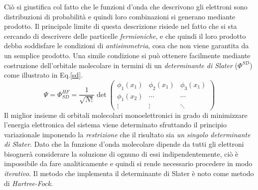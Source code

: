 \documentclass[oneside]{amsbook}
\numberwithin{section}{chapter}
\numberwithin{equation}{section}
\numberwithin{figure}{section}
\begin{document}
Ciò si giustifica col fatto che le funzioni d'onda che descrivono gli elettroni sono distribuzioni di probabilità e quindi loro combinazioni si generano mediante prodotto.
Il principale limite di questa descrizione risiede nel fatto che si sta cercando di descrivere delle particelle \emph{fermioniche}, e che quindi il loro prodotto debba soddisfare le condizioni di \emph{antisimmetria}, cosa che non viene garantita da un semplice prodotto. Una simile condizione si può ottenere facilmente mediante costruzione dell'orbitale molecolare in termini di un \emph{determinante di Slater} ($\Phi ^{SD}$) come illustrato in Eq.\ref{sd}. 
\begin{equation}
\label{sd}
\Psi = \Phi^{HF} _{SD}= \frac{1}{\sqrt{N!}} \det
\begin{pmatrix}
\phi _1 (x_1) & \phi _2 (x_1) & \phi _3 (x_1) \\
\phi _1 (x_2) & \cdots &\cdots \\
\vdots & \vdots & \ddots
\end{pmatrix}
\end{equation}
Il miglior insieme di orbitali molecolari monoelettronici in grado di minimizzare l'energia elettronica del sistema viene determinato sfruttando il principio variazionale imponendo la \emph{restrizione} che il risultato sia \emph{un singolo determinante di Slater}. Dato che la funzione d'onda molecolare dipende da tutti gli elettroni bisognerà considerare la soluzione di ognuno di essi indipendentemente, ciò è impossibile da fare analiticamente e quindi si rende necessario procedere in modo \emph{ iterativo}. Il metodo che implementa il determinante di Slater è noto come metodo di \emph{Hartree-Fock}.
\end{document}
